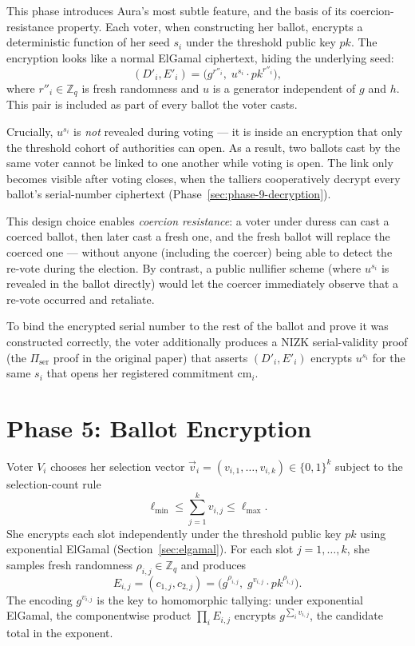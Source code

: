 \documentclass[12pt,a4paper,oneside]{report}
\begin{document}
This phase introduces Aura's most subtle feature, and the basis of its 
coercion-resistance property. Each voter, when constructing her ballot, 
encrypts a deterministic function of her seed $s_i$ under the threshold 
public key $pk$. The encryption looks like a normal ElGamal ciphertext, 
hiding the underlying seed:
\[
    (D'_i, E'_i) = \big(g^{r''_i},\; u^{s_i} \cdot pk^{r''_i}\big),
\]
where $r''_i \in \mathbb{Z}_q$ is fresh randomness and $u$ is a 
generator independent of $g$ and $h$. This pair is included as part 
of every ballot the voter casts.

Crucially, $u^{s_i}$ is \textit{not} revealed during voting --- it is 
inside an encryption that only the threshold cohort of authorities can 
open. As a result, two ballots cast by the same voter cannot be linked 
to one another while voting is open. The link only becomes visible 
after voting closes, when the talliers cooperatively decrypt every 
ballot's serial-number ciphertext (Phase~\ref{sec:phase-9-decryption}).

This design choice enables \textit{coercion resistance}: a voter under 
duress can cast a coerced ballot, then later cast a fresh one, and the 
fresh ballot will replace the coerced one --- without anyone (including 
the coercer) being able to detect the re-vote during the election. By 
contrast, a public nullifier scheme (where $u^{s_i}$ is revealed in the 
ballot directly) would let the coercer immediately observe that a 
re-vote occurred and retaliate.

To bind the encrypted serial number to the rest of the ballot and prove 
it was constructed correctly, the voter additionally produces a NIZK 
serial-validity proof (the $\Pi_{\text{ser}}$ proof in the original 
paper) that asserts $(D'_i, E'_i)$ encrypts $u^{s_i}$ for the same $s_i$ 
that opens her registered commitment $\text{cm}_i$.

\section{Phase 5: Ballot Encryption}
\label{sec:phase-5-encryption}

Voter $V_i$ chooses her selection vector 
$\vec{v}_i = (v_{i, 1}, \ldots, v_{i, k}) \in \{0, 1\}^k$ subject to the 
selection-count rule
\[
    \ell_{\min} \le \sum_{j=1}^{k} v_{i, j} \le \ell_{\max}.
\]
She encrypts each slot independently under the threshold public key $pk$ 
using exponential ElGamal (Section~\ref{sec:elgamal}). For each slot 
$j = 1, \ldots, k$, she samples fresh randomness 
$\rho_{i, j} \in \mathbb{Z}_q$ and produces
\[
    E_{i, j} = (c_{1, j}, c_{2, j}) = \big(g^{\rho_{i, j}},\; g^{v_{i, j}} \cdot pk^{\rho_{i, j}}\big).
\]
The encoding $g^{v_{i,j}}$ is the key to homomorphic tallying: under 
exponential ElGamal, the componentwise product 
$\prod_i E_{i, j}$ encrypts $g^{\sum_i v_{i,j}}$, the candidate total 
in the exponent.
\end{document}
